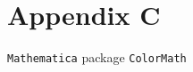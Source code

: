 \documentclass[main.tex]{subfiles}
\begin{document}
\renewcommand{\chaptername}{}
\renewcommand{\thechapter}{}
\renewcommand{\thetable}{C.\arabic{table}}
\renewcommand{\thesection}{C.\arabic{section}}
\renewcommand{\thesubsection}{C.\arabic{subsection}}
\renewcommand{\theequation}{C.\arabic{section}.\arabic{equation}}
\chapter{Appendix C} \label{app:polestructure}
\texttt{Mathematica} package \texttt{ColorMath}~\cite{Sjodahl:2012nk}
\end{document}
